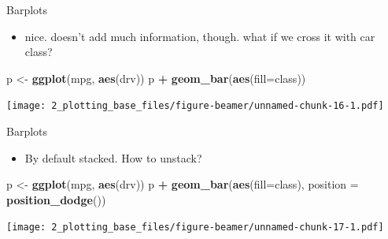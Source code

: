 \documentclass[
  ignorenonframetext,
]{beamer}
\newenvironment{Shaded}{\begin{snugshade}}{\end{snugshade}}
\newcommand{\DataTypeTok}[1]{\textcolor[rgb]{0.13,0.29,0.53}{#1}}
\newcommand{\KeywordTok}[1]{\textcolor[rgb]{0.13,0.29,0.53}{\textbf{#1}}}
\newcommand{\NormalTok}[1]{#1}
\newcommand{\OperatorTok}[1]{\textcolor[rgb]{0.81,0.36,0.00}{\textbf{#1}}}
\newcommand{\StringTok}[1]{\textcolor[rgb]{0.31,0.60,0.02}{#1}}
\providecommand{\tightlist}{%
  \setlength{\itemsep}{0pt}\setlength{\parskip}{0pt}}
\begin{document}
\begin{frame}[fragile]{Barplots}
\protect\hypertarget{barplots-3}{}

\begin{itemize}
\tightlist
\item
  nice. doesn't add much information, though. what if we cross it with
  car class?
\end{itemize}

\begin{Shaded}
\begin{Highlighting}[]
\NormalTok{p <-}\StringTok{ }\KeywordTok{ggplot}\NormalTok{(mpg, }\KeywordTok{aes}\NormalTok{(drv))}
\NormalTok{p }\OperatorTok{+}\StringTok{ }\KeywordTok{geom_bar}\NormalTok{(}\KeywordTok{aes}\NormalTok{(}\DataTypeTok{fill=}\NormalTok{class))}
\end{Highlighting}
\end{Shaded}

\texttt{[image: 2\_plotting\_base\_files/figure-beamer/unnamed-chunk-16-1.pdf]}

\end{frame}

\begin{frame}[fragile]{Barplots}
\protect\hypertarget{barplots-4}{}

\begin{itemize}
\tightlist
\item
  By default stacked. How to unstack?
\end{itemize}

\begin{Shaded}
\begin{Highlighting}[]
\NormalTok{p <-}\StringTok{ }\KeywordTok{ggplot}\NormalTok{(mpg, }\KeywordTok{aes}\NormalTok{(drv))}
\NormalTok{p }\OperatorTok{+}\StringTok{ }\KeywordTok{geom_bar}\NormalTok{(}\KeywordTok{aes}\NormalTok{(}\DataTypeTok{fill=}\NormalTok{class), }\DataTypeTok{position =} \KeywordTok{position_dodge}\NormalTok{())}
\end{Highlighting}
\end{Shaded}

\texttt{[image: 2\_plotting\_base\_files/figure-beamer/unnamed-chunk-17-1.pdf]}

\end{frame}
\end{document}
